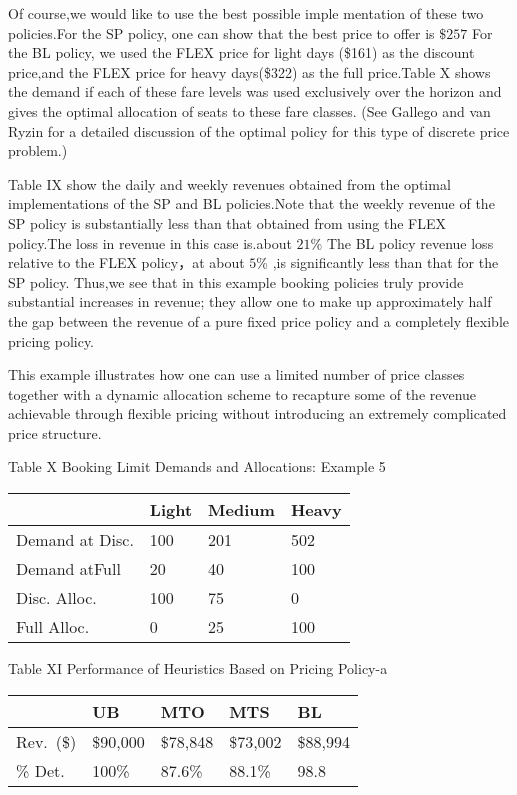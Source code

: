 Of course,we would like to use the best possible imple mentation of
these two policies.For the SP policy, one can show that the best price
to offer is \(\$ 257\) For the BL policy, we used the FLEX price for
light days (\$161) as the discount price,and the FLEX price for heavy
days(\$322) as the full price.Table X shows the demand if each of these
fare levels was used exclusively over the horizon and gives the optimal
allocation of seats to these fare classes. (See Gallego and van Ryzin
for a detailed discussion of the optimal policy for this type of
discrete price problem.)

Table IX show the daily and weekly revenues obtained from the optimal
implementations of the SP and BL policies.Note that the weekly revenue
of the SP policy is substantially less than that obtained from using the
FLEX policy.The loss in revenue in this case is.about \(21 \%\) The BL
policy revenue loss relative to the FLEX policy，at about \(5 \%\) ,is
significantly less than that for the SP policy. Thus,we see that in this
example booking policies truly provide substantial increases in revenue;
they allow one to make up approximately half the gap between the revenue
of a pure fixed price policy and a completely flexible pricing policy.

This example illustrates how one can use a limited number of price
classes together with a dynamic allocation scheme to recapture some of
the revenue achievable through flexible pricing without introducing an
extremely complicated price structure.

Table X Booking Limit Demands and Allocations: Example 5

\begin{longtable}[]{@{}|l|l|l|l|@{}}
\toprule\noalign{}
\endhead
\bottomrule\noalign{}
\endlastfoot
\hline
& Light & Medium & Heavy \\
\hline
Demand at Disc. & 100 & 201 & 502 \\
\hline
Demand atFull & 20 & 40 & 100 \\
\hline
Disc. Alloc. & 100 & 75 & 0 \\
\hline
Full Alloc. & 0 & 25 & 100 \\
\hline
\end{longtable}

Table XI Performance of Heuristics Based on Pricing Policy-a

\begin{longtable}[]{@{}|l|l|l|l|l|@{}}
\toprule\noalign{}
\endhead
\bottomrule\noalign{}
\endlastfoot
\hline
& UB & MTO & MTS & BL \\
\hline
Rev.~(\$) & \$90,000 & \$78,848 & \$73,002 & \$88,994 \\
\hline
\% Det. & 100\% & 87.6\% & 88.1\% & 98.8 \\
\hline
\end{longtable}

